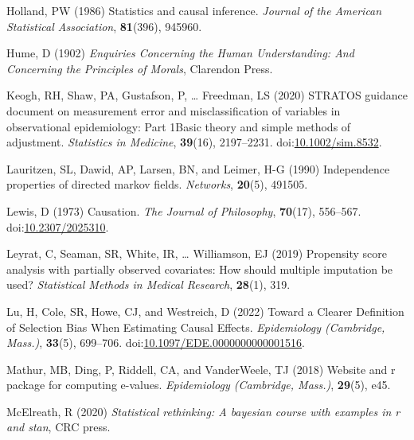 \documentclass[
  singlecolumn]{article}
\newlength{\cslhangindent}
\newlength{\cslentryspacingunit} %
\newenvironment{CSLReferences}[2] %
 {%
  \setlength{\parindent}{0pt}
  \ifodd #1
  \let\oldpar\par
  \def\par{\hangindent=\cslhangindent\oldpar}
  \fi
  \setlength{\parskip}{#2\cslentryspacingunit}
 }%
 {}
\begin{document}
\begin{CSLReferences}{1}{0}
\leavevmode{}%
Holland, PW (1986) Statistics and causal inference. \emph{Journal of the
American Statistical Association}, \textbf{81}(396), 945960.

\leavevmode{}%
Hume, D (1902) \emph{Enquiries Concerning the Human Understanding: And
Concerning the Principles of Morals}, Clarendon Press.

\leavevmode{}%
Keogh, RH, Shaw, PA, Gustafson, P, \ldots{} Freedman, LS (2020) STRATOS
guidance document on measurement error and misclassification of
variables in observational epidemiology: Part 1{\textemdash}Basic theory
and simple methods of adjustment. \emph{Statistics in Medicine},
\textbf{39}(16), 2197--2231.
doi:\href{https://doi.org/10.1002/sim.8532}{10.1002/sim.8532}.

\leavevmode{}%
Lauritzen, SL, Dawid, AP, Larsen, BN, and Leimer, H-G (1990)
Independence properties of directed markov fields. \emph{Networks},
\textbf{20}(5), 491505.

\leavevmode{}%
Lewis, D (1973) Causation. \emph{The Journal of Philosophy},
\textbf{70}(17), 556--567.
doi:\href{https://doi.org/10.2307/2025310}{10.2307/2025310}.

\leavevmode{}%
Leyrat, C, Seaman, SR, White, IR, \ldots{} Williamson, EJ (2019)
Propensity score analysis with partially observed covariates: How should
multiple imputation be used? \emph{Statistical Methods in Medical
Research}, \textbf{28}(1), 319.

\leavevmode{}%
Lu, H, Cole, SR, Howe, CJ, and Westreich, D (2022) Toward a Clearer
Definition of Selection Bias When Estimating Causal Effects.
\emph{Epidemiology (Cambridge, Mass.)}, \textbf{33}(5), 699--706.
doi:\href{https://doi.org/10.1097/EDE.0000000000001516}{10.1097/EDE.0000000000001516}.

\leavevmode{}%
Mathur, MB, Ding, P, Riddell, CA, and VanderWeele, TJ (2018) Website and
r package for computing e-values. \emph{Epidemiology (Cambridge,
Mass.)}, \textbf{29}(5), e45.

\leavevmode{}%
McElreath, R (2020) \emph{Statistical rethinking: A bayesian course with
examples in r and stan}, CRC press.


\end{CSLReferences}
\end{document}
